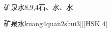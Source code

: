 \begin{entry}{矿泉水}{8,9,4}{⽯、⽔、⽔}
  \begin{phonetics}{矿泉水}{kuang4quan2shui3}[][HSK 4]
  \end{phonetics}
\end{entry}
